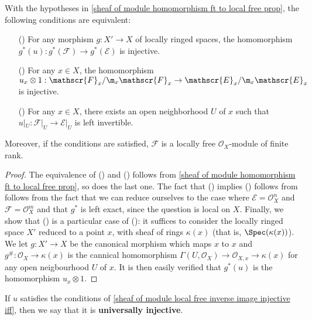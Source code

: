 \begin{corollary}\label{sheaf of module local free inverse image injective iff}
With the hypotheses in \cref{sheaf of module homomorphism ft to local free prop}, the following conditions are equivalent:
\begin{itemize}
\item[(\rmnum{1})] For any morphism $g:X'\to X$ of locally ringed spaces, the homomorphism $g^*(u):g^*(\mathscr{F})\to g^*(\mathscr{E})$ is injective.
\item[(\rmnum{2})] For any $x\in X$, the homomorphism $u_x\otimes 1:\mathscr{F}_x/\m_x\mathscr{F}_x\to\mathscr{E}_x/\m_x\mathscr{E}_x$ is injective.
\item[(\rmnum{3})] For any $x\in X$, there exists an open neighborhood $U$ of $x$ such that $u|_U:\mathscr{F}|_U\to\mathscr{E}|_U$ is left invertible.
\end{itemize}
Moreover, if the conditions are satisfied, $\mathscr{F}$ is a locally free $\mathscr{O}_X$-module of finite rank.
\end{corollary}
\begin{proof}
The equivalence of () and () follows from \cref{sheaf of module homomorphism ft to local free prop}, so does the last one. The fact that () implies () follows from follows from the fact that we can reduce ourselves to the case where $\mathscr{E}=\mathscr{O}_X^n$ and $\mathscr{F}=\mathscr{O}_X^m$ and that $g^*$ is left exact, since the question is local on $X$. Finally, we show that () is a particular case of (): it suffices to consider the locally ringed space $X'$ reduced to a point $x$, with sheaf of rings $\kappa(x)$ (that is, $\Spec(\kappa(x))$). We let $g:X'\to X$ be the canonical morphism which maps $x$ to $x$ and $g^{\#}:\mathscr{O}_X\to\kappa(x)$ is the cannical homomorphism $\Gamma(U,\mathscr{O}_X)\to\mathscr{O}_{X,x}\to\kappa(x)$ for any open neigbourhood $U$ of $x$. It is then easily verified that $g^*(u)$ is the homomorphism $u_x\otimes 1$. 
\end{proof}
\begin{remark}
If $u$ satisfies the conditions of \cref{sheaf of module local free inverse image injective iff}, then we say that it is \textbf{universally injective}.
\end{remark}

